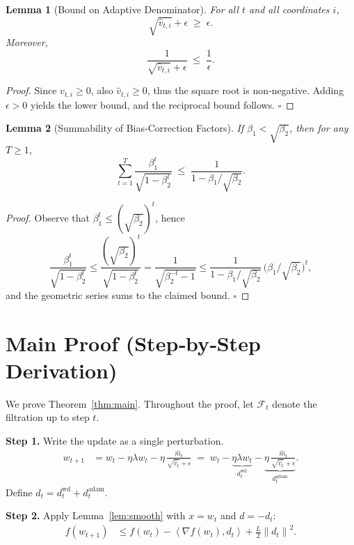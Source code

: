 \documentclass{article}
\newtheorem{lemma}{Lemma}
\newcommand{\norm}[1]{\left\|#1\right\|}
\newcommand{\ip}[2]{\left\langle #1,#2\right\rangle}
\begin{document}
\begin{lemma}[Bound on Adaptive Denominator]\label{lem:denom}
For all $t$ and all coordinates $i$,
\[
\sqrt{\hat v_{t,i}}+\epsilon\;\ge\;\epsilon.
\]
Moreover,
\[
\frac{1}{\sqrt{\hat v_{t,i}}+\epsilon}\;\le\;\frac{1}{\epsilon}.
\]
\end{lemma}
\begin{proof}
Since $v_{t,i}\ge0$, also $\hat v_{t,i}\ge0$, thus the square root is non‑negative. Adding $\epsilon>0$ yields the lower bound, and the reciprocal bound follows. \hfill $\square$
\end{proof}

\begin{lemma}[Summability of Bias‑Correction Factors]\label{lem:beta}
If $\beta_{1}<\sqrt{\beta_{2}}$, then for any $T\ge1$,
\[
\sum_{t=1}^{T}\frac{\beta_{1}^{t}}{\sqrt{1-\beta_{2}^{t}}}\;\le\;
\frac{1}{1-\beta_{1}/\sqrt{\beta_{2}}}.
\]
\end{lemma}
\begin{proof}
Observe that $\beta_{1}^{t}\le (\sqrt{\beta_{2}})^{t}$, hence
\[
\frac{\beta_{1}^{t}}{\sqrt{1-\beta_{2}^{t}}}
\le
\frac{(\sqrt{\beta_{2}})^{t}}{\sqrt{1-\beta_{2}^{t}}}
=
\frac{1}{\sqrt{\beta_{2}^{-t}-1}}
\le
\frac{1}{1-\beta_{1}/\sqrt{\beta_{2}}}\,\big(\beta_{1}/\sqrt{\beta_{2}}\big)^{t},
\]
and the geometric series sums to the claimed bound. \hfill $\square$
\end{proof}

\section*{Main Proof (Step‑by‑Step Derivation)}
We prove Theorem~\ref{thm:main}. Throughout the proof, let $\mathcal{F}_{t}$ denote the filtration up to step $t$.

\noindent\textbf{Step 1.} Write the update as a single perturbation.
\begin{align}
w_{t+1}
&= w_{t} - \eta\lambda w_{t}
      - \eta\,\frac{\hat m_{t}}{\sqrt{\hat v_{t}}+\epsilon}
\;=\;
w_{t} - \underbrace{\eta\lambda w_{t}}_{d_{t}^{\text{wd}}}
      - \underbrace{\eta\,\frac{\hat m_{t}}{\sqrt{\hat v_{t}}+\epsilon}}_{d_{t}^{\text{adam}}}.
\label{eq:update}
\end{align}
Define $d_{t}=d_{t}^{\text{wd}}+d_{t}^{\text{adam}}$.

\noindent\textbf{Step 2.} Apply Lemma~\ref{lem:smooth} with $x=w_{t}$ and $d=-d_{t}$:
\begin{align}
f(w_{t+1})
&\le f(w_{t}) - \ip{\nabla f(w_{t})}{d_{t}} + \frac{L}{2}\norm{d_{t}}^{2}.
\label{eq:smooth}
\end{align}
\end{document}
